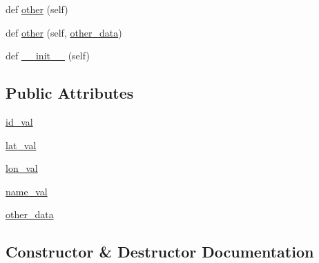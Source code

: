 \begin{DoxyCompactItemize}
\item 
def \hyperlink{classbridges_1_1data__src__dependent_1_1amenity_1_1amenity_data_ac3abcf4b096288289f27a979a311a468}{other} (self)
\item 
def \hyperlink{classbridges_1_1data__src__dependent_1_1amenity_1_1amenity_data_a22ee09770e02e0e2ab19631eb49c5dbf}{other} (self, \hyperlink{classbridges_1_1data__src__dependent_1_1amenity_1_1amenity_data_ac3f1874a399079688cb87272426aa4f4}{other\+\_\+data})
\item 
def \hyperlink{classbridges_1_1data__src__dependent_1_1amenity_1_1amenity_data_a48a325b2504ed37868648096cd67309f}{\+\_\+\+\_\+init\+\_\+\+\_\+} (self)
\end{DoxyCompactItemize}
\subsection*{Public Attributes}
\begin{DoxyCompactItemize}
\item 
\hyperlink{classbridges_1_1data__src__dependent_1_1amenity_1_1amenity_data_a772d1e7423a3c07e3df0a24b6770a07f}{id\+\_\+val}
\item 
\hyperlink{classbridges_1_1data__src__dependent_1_1amenity_1_1amenity_data_a62c0f3cd20edddddef2652895644a6ad}{lat\+\_\+val}
\item 
\hyperlink{classbridges_1_1data__src__dependent_1_1amenity_1_1amenity_data_afea1c532aaf9a63c97db085d83e8e3d9}{lon\+\_\+val}
\item 
\hyperlink{classbridges_1_1data__src__dependent_1_1amenity_1_1amenity_data_ab0a7b50037d63fcd49ccf2d19d4f0c75}{name\+\_\+val}
\item 
\hyperlink{classbridges_1_1data__src__dependent_1_1amenity_1_1amenity_data_ac3f1874a399079688cb87272426aa4f4}{other\+\_\+data}
\end{DoxyCompactItemize}


\subsection{Constructor \& Destructor Documentation}
\mbox{\label{classbridges_1_1data__src__dependent_1_1amenity_1_1amenity_data_a48a325b2504ed37868648096cd67309f}} 
